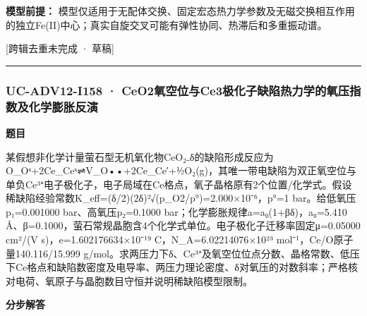 \documentclass[UTF8,11pt,a4paper]{ctexart}
\begin{document}
\noindent\textbf{模型前提：}
模型仅适用于无配体交换、固定宏态热力学参数及无磁交换相互作用的独立Fe(II)中心；真实自旋交叉可能有弹性协同、热滞后和多重振动谱。\par
\noindent\textcolor{red!65!black}{[跨辑去重未完成 · 草稿]} \par
\medskip\hrule\medskip
{}
\subsubsection*{UC-ADV12-I158 · CeO2氧空位与Ce3极化子缺陷热力学的氧压指数及化学膨胀反演}
\noindent\textbf{题目}\par
某假想非化学计量萤石型无机氧化物CeO₂₋δ的缺陷形成反应为O\_Oˣ+2Ce\_Ceˣ⇌V\_O••+2Ce\_Ce′+½O₂(g)，其唯一带电缺陷为双正氧空位与单负Ce³⁺电子极化子，电子局域在Ce格点，氧子晶格原有2个位置/化学式。假设稀缺陷经验常数K\_eff=(δ/2)(2δ)²√(p\_O2/p°)=2.000×10⁻⁶，p°=1 bar。给低氧压p₁=0.001000 bar、高氧压p₂=0.1000 bar；化学膨胀规律a=a₀(1+βδ)，a₀=5.410 Å、β=0.1000，萤石常规晶胞含4个化学式单位。电子极化子迁移率固定μ=0.05000 cm²/(V s)，e=1.602176634×10⁻¹⁹ C，N\_A=6.02214076×10²³ mol⁻¹，Ce/O原子量140.116/15.999 g/mol。求两压力下δ、Ce³⁺及氧空位位点分数、晶格常数、低压下Ce格点和缺陷数密度及电导率、两压力理论密度、δ对氧压的对数斜率；严格核对电荷、氧原子与晶胞数目守恒并说明稀缺陷模型限制。\par
\medskip\noindent\textbf{分步解答}
\end{document}

